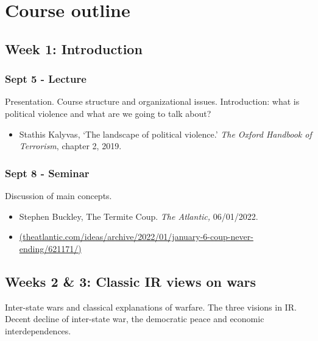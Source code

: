 \documentclass[12pt, a4paper]{article}
\begin{document}
\newpage
\section{Course outline}

\subsection*{Week 1: Introduction}

\subsubsection*{Sept 5 - Lecture}

Presentation. Course structure and organizational issues. Introduction: what is political violence and what are we going to talk about?

\begin{itemize}
\setlength\itemsep{0pt}
\item Stathis Kalyvas, `The landscape of political violence.' \textit{The Oxford Handbook of Terrorism}, chapter 2, 2019.
\end{itemize}

\subsubsection*{Sept 8 - Seminar}

Discussion of main concepts.

\begin{itemize}
\setlength\itemsep{0pt}
\item Stephen Buckley, The Termite Coup. \textit{The Atlantic,} 06/01/2022.
\item[] \href{https://www.theatlantic.com/ideas/archive/2022/01/january-6-coup-never-ending/621171/}{(theatlantic.com/ideas/archive/2022/01/january-6-coup-never-ending/621171/)}
\end{itemize}

\hline %

\subsection*{Weeks 2 \& 3: Classic IR views on wars}

Inter-state wars and classical explanations of warfare. The three visions in IR. Decent decline of inter-state war, the democratic peace and economic interdependences.
\end{document}
